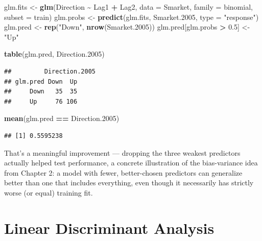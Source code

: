 \documentclass[
  11pt,
]{article}
\newenvironment{Shaded}{\begin{snugshade}}{\end{snugshade}}
\newcommand{\AttributeTok}[1]{\textcolor[rgb]{0.13,0.29,0.53}{#1}}
\newcommand{\FloatTok}[1]{\textcolor[rgb]{0.00,0.00,0.81}{#1}}
\newcommand{\FunctionTok}[1]{\textcolor[rgb]{0.13,0.29,0.53}{\textbf{#1}}}
\newcommand{\NormalTok}[1]{#1}
\newcommand{\OtherTok}[1]{\textcolor[rgb]{0.56,0.35,0.01}{#1}}
\newcommand{\SpecialCharTok}[1]{\textcolor[rgb]{0.81,0.36,0.00}{\textbf{#1}}}
\newcommand{\StringTok}[1]{\textcolor[rgb]{0.31,0.60,0.02}{#1}}
\begin{document}
\begin{Shaded}
\begin{Highlighting}[]
\NormalTok{glm.fits }\OtherTok{\textless{}{-}} \FunctionTok{glm}\NormalTok{(Direction }\SpecialCharTok{\textasciitilde{}}\NormalTok{ Lag1 }\SpecialCharTok{+}\NormalTok{ Lag2, }\AttributeTok{data =}\NormalTok{ Smarket,}
                 \AttributeTok{family =}\NormalTok{ binomial, }\AttributeTok{subset =}\NormalTok{ train)}
\NormalTok{glm.probs }\OtherTok{\textless{}{-}} \FunctionTok{predict}\NormalTok{(glm.fits, Smarket}\FloatTok{.2005}\NormalTok{, }\AttributeTok{type =} \StringTok{"response"}\NormalTok{)}
\NormalTok{glm.pred }\OtherTok{\textless{}{-}} \FunctionTok{rep}\NormalTok{(}\StringTok{"Down"}\NormalTok{, }\FunctionTok{nrow}\NormalTok{(Smarket}\FloatTok{.2005}\NormalTok{))}
\NormalTok{glm.pred[glm.probs }\SpecialCharTok{\textgreater{}} \FloatTok{0.5}\NormalTok{] }\OtherTok{\textless{}{-}} \StringTok{"Up"}

\FunctionTok{table}\NormalTok{(glm.pred, Direction}\FloatTok{.2005}\NormalTok{)}
\end{Highlighting}
\end{Shaded}

\begin{verbatim}
##         Direction.2005
## glm.pred Down  Up
##     Down   35  35
##     Up     76 106
\end{verbatim}

\begin{Shaded}
\begin{Highlighting}[]
\FunctionTok{mean}\NormalTok{(glm.pred }\SpecialCharTok{==}\NormalTok{ Direction}\FloatTok{.2005}\NormalTok{)}
\end{Highlighting}
\end{Shaded}

\begin{verbatim}
## [1] 0.5595238
\end{verbatim}

That's a meaningful improvement --- dropping the three weakest
predictors actually helped test performance, a concrete illustration of
the bias-variance idea from Chapter 2: a model with fewer, better-chosen
predictors can generalize better than one that includes everything, even
though it necessarily has strictly worse (or equal) training fit.

\section{Linear Discriminant
Analysis}\label{linear-discriminant-analysis}
\end{document}
